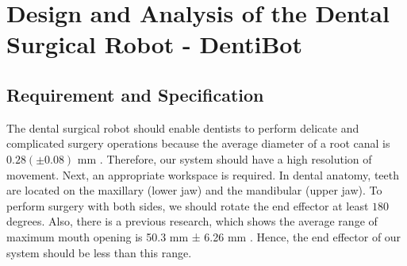 \chapter{Design and Analysis of the Dental Surgical Robot - DentiBot}
\label{chapter3}
\section{Requirement and Specification}
\label{sec:requirement}
\hspace*{6mm}The dental surgical robot should enable dentists to perform delicate and complicated surgery operations because the average diameter of a root canal is $0.28 (\pm 0.08)$ mm \cite{wu2002does}. Therefore, our system should have a high resolution of movement. Next, an appropriate workspace is required. In dental anatomy, teeth are located on the maxillary (lower jaw) and the mandibular (upper jaw). To perform surgery with both sides, we should rotate the end effector at least $180$ degrees. Also, there is a previous research, which shows the average range of maximum mouth opening is 50.3 mm ± 6.26 mm \cite{agrawal2015evaluation}. Hence, the end effector of our system should be less than this range.
